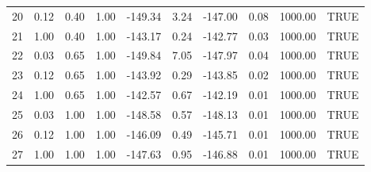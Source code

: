 \begin{table}[ht]
\begin{tabular}{rrrrrrrrrl}
  20 & 0.12 & 0.40 & 1.00 & -149.34 & 3.24 & -147.00 & 0.08 & 1000.00 & TRUE \\ 
  21 & 1.00 & 0.40 & 1.00 & -143.17 & 0.24 & -142.77 & 0.03 & 1000.00 & TRUE \\ 
  22 & 0.03 & 0.65 & 1.00 & -149.84 & 7.05 & -147.97 & 0.04 & 1000.00 & TRUE \\ 
  23 & 0.12 & 0.65 & 1.00 & -143.92 & 0.29 & -143.85 & 0.02 & 1000.00 & TRUE \\ 
  24 & 1.00 & 0.65 & 1.00 & -142.57 & 0.67 & -142.19 & 0.01 & 1000.00 & TRUE \\ 
  25 & 0.03 & 1.00 & 1.00 & -148.58 & 0.57 & -148.13 & 0.01 & 1000.00 & TRUE \\ 
  26 & 0.12 & 1.00 & 1.00 & -146.09 & 0.49 & -145.71 & 0.01 & 1000.00 & TRUE \\ 
  27 & 1.00 & 1.00 & 1.00 & -147.63 & 0.95 & -146.88 & 0.01 & 1000.00 & TRUE \\ 
   \hline
\end{tabular}
\end{table}

